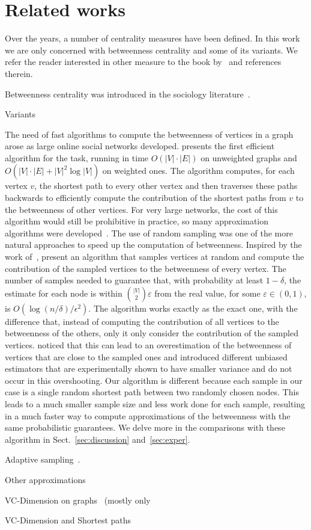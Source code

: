 \section{Related works}\label{sec:prevwork}
Over the years, a number of centrality measures have been defined. In this work
we are only concerned with betweenness centrality and some of its variants. We
refer the reader interested in other measure to the book by~\citet{Newman10} and
references therein.

Betweenness centrality was introduced in the sociology
literature~\citep{Anthonisse71,Freeman77}. 

Variants~\citep{Brandes08,DolevEP10,KourtellisASIT12,PfefferC12}

The need of fast algorithms to compute
the betweenness of vertices in a graph arose as large online social networks
developed. \citet{Brandes01} presents the first efficient algorithm for the
task, running in time $O(|V|\cdot|E|)$ on unweighted graphs and
$O(|V|\cdot|E|+|V|^2\log|V|)$ on weighted ones. The algorithm computes, for each
vertex $v$, the shortest path to every other vertex and then traverses these paths
backwards to efficiently compute the contribution of the shortest paths from $v$
to the betweenness of other vertices. For very large networks, the cost of this
algorithm would still be prohibitive in practice, so many approximation
algorithms were
developed~\citep{JacobKLPT05,BrandesP07,BaderKMM07,GeisbergerSS08,MaiyaBW10,LimMRT11}.
The use of random sampling was one of the more natural approaches to speed up
the computation of betweenness. Inspired by the work of~\citet{EppsteinW04},
\citet{JacobKLPT05,BrandesP07} present an algorithm that samples vertices at
random and compute the contribution of the sampled vertices to the betweenness
of every vertex. The number of samples needed to guarantee that, with
probability at least $1-\delta$, the estimate for each node is within
$\binom{|V|}{2}\varepsilon$ from the real value, for some $\varepsilon\in(0,1)$,
is $O(\log(n/\delta)/\epsilon^2)$. The algorithm works exactly as the exact
one, with the difference that, instead of computing the contribution of all
vertices to the betweenness of the others, only it only consider the
contribution of the sampled vertices. \citet{GeisbergerSS08} noticed that this
can lead to an overestimation of the betweenness of vertices that are close to
the sampled ones and introduced different unbiased estimators that are
experimentally shown to have smaller variance and do not occur in this
overshooting. Our algorithm is different because each sample in our case is a
single random shortest path between two randomly chosen nodes. This leads to a
much smaller sample size and less work done for each sample, resulting in a much
faster way to compute approximations of the betweenness with the same
probabilistic guarantees. We delve more in the comparisons with these algorithm
in Sect.~\ref{sec:discussion} and~\ref{sec:exper}.

Adaptive sampling~\citep{BaderKMM07,MaiyaBW10,LimMRT11}.

Other approximations~\citep{GkorouPE10,PrountzosP13,SaryuceSKC13}

VC-Dimension on graphs~\citep{AnthonyBC95,KranakisKRUW97,MubayiZ07,YcartR07}
(mostly only~\citep{KranakisKRUW97}

VC-Dimension and Shortest paths~\citep{AbrahamDFGW11}

